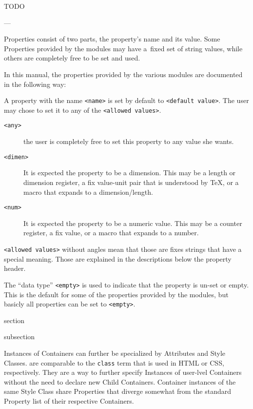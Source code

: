 TODO

---


Properties consist of two parts, the property's name and its
value. Some Properties provided by the {\CoCoTeX} modules may have
a~fixed set of string values, while others are completely free to be
set and used.

In this manual, the properties provided by the various modules are
documented in the following way:


A property with the name \texttt{<name>} is set by default to
\texttt{<default value>}. The user may chose to set it to any of the
\texttt{<allowed values>}.
\begin{description}
\item[\texttt{<any>}]  the user is completely free to set this
  property to any value she wants.
\item[\texttt{<dimen>}] It is expected the property to be a
  dimension. This may be a length or dimension register, a fix
  value-unit pair that is understood by \TeX, or a macro that expands
  to a dimension/length.
\item[\texttt{<num>}] It is expected the property to be a numeric
  value. This may be a counter register, a fix value, or a macro that
  expands to a number.
\end{description}
\lstinline{<allowed values>} without angles mean that those are fixes
strings that have a special meaning. Those are explained in the
descriptions below the property header.

The “data type” \texttt{<empty>} is used to indicate that the property
is un-set or empty. This is the default for some of the properties
provided by the {\CoCoTeX} modules, but basicly all properties can
be set to \texttt{<empty>}.


\begin{Heading}{section}
\end{Heading}


\begin{Heading}{subsection}
\end{Heading}


Instances of Containers can further be specialized by Attributes and
Style Classes.  are comparable to the
\texttt{class} term that is used in HTML or CSS, respectively.  They
are a way to further specify Instances of user-lvel Containers without
the need to declare new Child Containers. Container instances of the
same Style Class share Properties that diverge somewhat from the
standard Property list of their respective Containers.

